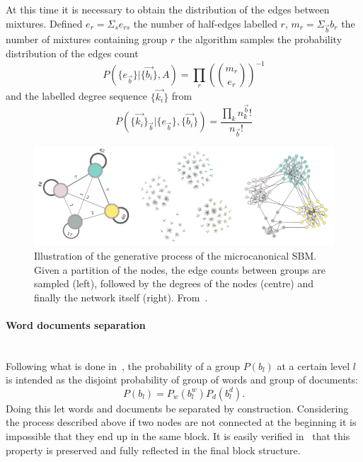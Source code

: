 At this time it is necessary to obtain the distribution of the edges between mixtures. Defined $e_r=\Sigma_s e_{rs}$ the number of half-edges labelled $r$, $m_r=\Sigma_{\vec{b}} b_r$ the number of mixtures containing group $r$ the algorithm samples the probability distribution of the edges count
\[P(\{e_{\vec{b}}\}|\{\vec{b_i}\}, A)=\prod_r\left(\binom{m_r}{e_r}\right)^{-1}\] and the labelled degree sequence $\{\vec{k_i}\}$ from \[P(\{\vec{k_i}\}_{\vec{b}}|\{e_{\vec{b}}\}, \{\vec{b_i}\})=\frac{\prod_k n_k^{\vec{b}}!}{n_{\vec{b}}!}\]
\begin{figure}[htb]
	\centering
	\includegraphics[width=0.8\linewidth]{pictures/topic/peixioto_passages.png}
	\caption{Illustration of the generative process of the microcanonical SBM. Given a partition of the
		nodes, the edge counts between groups are sampled (left), followed by the degrees of the nodes (centre) and finally
		the network itself (right). From~\cite{Peixoto2017}.}
	\label{fig:hsbm-sum}
\end{figure}

\paragraph{Word documents separation}\mbox{}\\
Following what is done in~\cite{gerlach2018network}, the probability of a group $P(b_l)$ at a certain level $l$ is intended as the disjoint probability of group of words and group of documents:
\begin{equation}
  P(b_l)=P_w(b_l^w)P_d(b_l^d).
\end{equation}
Doing this let words and documents be separated by construction. Considering the process described above if two nodes are not connected at the beginning it is impossible that they end up in the same block. It is easily verified in~\cite{peixoto2014efficient} that this property is preserved and fully reflected in the final block structure.
